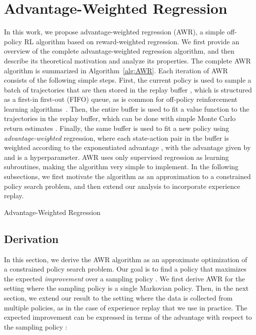 \documentclass{article} \usepackage{iclr2020_conference,times}
\begin{document}
\section{Advantage-Weighted Regression}
In this work, we propose advantage-weighted regression (AWR), a simple off-policy RL algorithm based on reward-weighted regression. We first provide an overview of the complete advantage-weighted regression algorithm, and then describe its theoretical motivation and analyze its properties. The complete AWR algorithm is summarized in Algorithm~\ref{alg:AWR}. Each iteration  of AWR consists of the following simple steps. First, the current policy  is used to sample a batch of trajectories  that are then stored in the replay buffer , which is structured as a first-in first-out (FIFO) queue, as is common for off-policy reinforcement learning algorithms~\citep{mnih2015humanlevel,DDPG2016}. Then, the entire buffer  is used to fit a value function  to the trajectories in the replay buffer, which can be done with simple Monte Carlo return estimates . Finally, the same buffer is used to fit a new policy using \emph{advantage-weighted} regression, where each state-action pair in the buffer is weighted according to the exponentiated advantage , with the advantage given by  and  is a hyperparameter. AWR uses only supervised regression as learning subroutines, making the algorithm very simple to implement. In the following subsections, we first motivate the algorithm as an approximation to a constrained policy search problem, and then extend our analysis to incorporate experience replay.

\begin{algorithm}[t]
            \caption{Advantage-Weighted Regression}
            \begin{algorithmic}[1]
            
            \STATE{}
            \STATE{}
            
            \FOR{}
                \STATE{}
\STATE{}
                \STATE{}
            \ENDFOR
            
            \end{algorithmic}
            \label{alg:AWR}
\end{algorithm}

\subsection{Derivation}
In this section, we derive the AWR algorithm as an approximate optimization of a constrained policy search problem. Our goal is to find a policy that maximizes the expected \emph{improvement}  over a sampling policy . We first derive AWR for the setting where the sampling policy is a single Markovian policy. Then, in the next section, we extend our result to the setting where the data is collected from multiple policies, as in the case of experience replay that we use in practice. The expected improvement  can be expressed in terms of the advantage  with respect to the sampling policy  \citep{Kakade2002,TRPOschulman15}:
\end{document}
